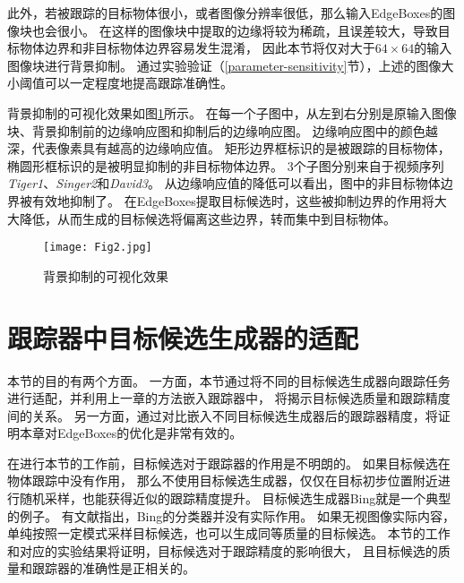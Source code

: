 此外，若被跟踪的目标物体很小，或者图像分辨率很低，那么输入EdgeBoxes的图像块也会很小。
在这样的图像块中提取的边缘将较为稀疏，且误差较大，导致目标物体边界和非目标物体边界容易发生混淆，
因此本节将仅对大于$64\times64$的输入图像块进行背景抑制。
通过实验验证（\ref{parameter-sensitivity}节），上述的图像大小阈值可以一定程度地提高跟踪准确性。

背景抑制的可视化效果如图\ref{punish}所示。
在每一个子图中，从左到右分别是原输入图像块、背景抑制前的边缘响应图和抑制后的边缘响应图。
边缘响应图中的颜色越深，代表像素具有越高的边缘响应值。
矩形边界框标识的是被跟踪的目标物体，椭圆形框标识的是被明显抑制的非目标物体边界。
3个子图分别来自于视频序列\textit{Tiger1}、\textit{Singer2}和\textit{David3}。
从边缘响应值的降低可以看出，图中的非目标物体边界被有效地抑制了。
在EdgeBoxes提取目标候选时，这些被抑制边界的作用将大大降低，从而生成的目标候选将偏离这些边界，转而集中到目标物体。

\begin{figure}
	\centering
	\texttt{[image: Fig2.jpg]}
	\caption{背景抑制的可视化效果}
	\label{punish}
\end{figure}



\section{跟踪器中目标候选生成器的适配}
\label{generatoradaptsec}
本节的目的有两个方面。
一方面，本节通过将不同的目标候选生成器向跟踪任务进行适配，并利用上一章的方法嵌入跟踪器中，
将揭示目标候选质量和跟踪精度间的关系。
另一方面，通过对比嵌入不同目标候选生成器后的跟踪器精度，将证明本章对EdgeBoxes的优化是非常有效的。

在进行本节的工作前，目标候选对于跟踪器的作用是不明朗的。
如果目标候选在物体跟踪中没有作用，
那么不使用目标候选生成器，仅仅在目标初步位置附近进行随机采样，也能获得近似的跟踪精度提升。
目标候选生成器Bing就是一个典型的例子。
有文献指出，Bing的分类器并没有实际作用。
如果无视图像实际内容，单纯按照一定模式采样目标候选，也可以生成同等质量的目标候选。
本节的工作和对应的实验结果将证明，目标候选对于跟踪精度的影响很大，
且目标候选的质量和跟踪器的准确性是正相关的。

